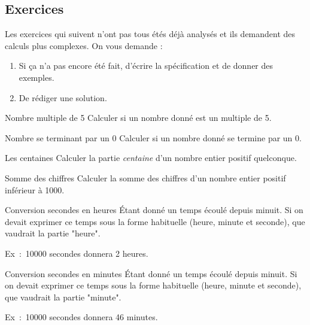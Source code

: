 		\subsection{Exercices}
		\label{prem-ex-cplx}
		
			Les exercices qui suivent n'ont pas tous étés déjà analysés
			et ils demandent des calculs plus complexes.
			On vous demande :
			\begin{enumerate}
			\item
				Si ça n'a pas encore été fait,
				d'écrire la spécification et de donner des exemples.
			\item
				De rédiger une solution.
			\end{enumerate}
		
			\begin{Exercice}{Nombre multiple de 5}
				Calculer si un nombre donné est un multiple de 5.
			\end{Exercice}
		
			\begin{Exercice}{Nombre se terminant par un 0}
				Calculer si un nombre donné se termine par un 0.
			\end{Exercice}
	
			\begin{Exercice}{Les centaines}
				Calculer la partie \emph{centaine}
				d'un nombre entier positif quelconque.
			\end{Exercice}
	
			\begin{Exercice}{Somme des chiffres}
				Calculer la somme des chiffres
				d’un nombre entier positif inférieur à 1000.
			\end{Exercice}
		
			\begin{Exercice}{Conversion secondes en heures}
				Étant donné un temps écoulé depuis minuit.
				Si on devait exprimer ce temps sous la forme
				habituelle (heure, minute et seconde),
				que vaudrait la partie "heure".
		
				Ex~:~10000 secondes donnera 2 heures.
			\end{Exercice}
		
			\begin{Exercice}{Conversion secondes en minutes}
				Étant donné un temps écoulé depuis minuit.
				Si on devait exprimer ce temps sous la forme
				habituelle (heure, minute et seconde),
				que vaudrait la partie "minute".
		
				Ex~:~10000 secondes donnera 46 minutes.
			\end{Exercice}
		
